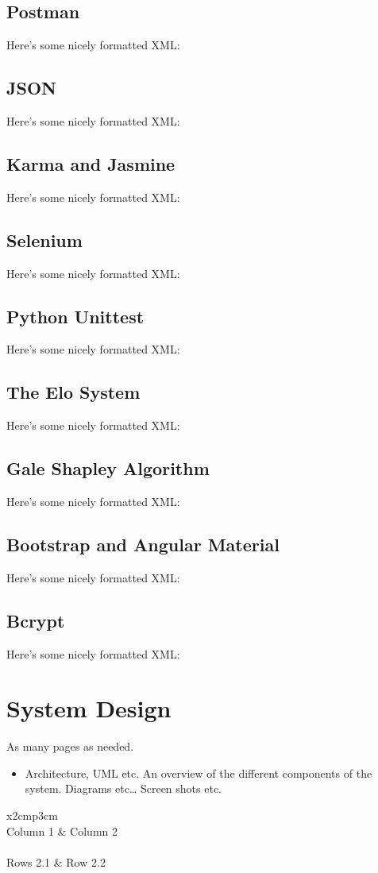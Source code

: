 \section{Postman}
Here's some nicely formatted XML:
\section{JSON}
Here's some nicely formatted XML:
\section{Karma and Jasmine}
Here's some nicely formatted XML:
\section{Selenium}
Here's some nicely formatted XML:
\section{Python Unittest}
Here's some nicely formatted XML:
\section{The Elo System}
Here's some nicely formatted XML:
\section{Gale Shapley Algorithm}
Here's some nicely formatted XML:
\section{Bootstrap and Angular Material}
Here's some nicely formatted XML:
\section{Bcrypt}
Here's some nicely formatted XML:
\chapter{System Design}
As many pages as needed.
\begin{itemize}
	\item Architecture, UML etc. An overview of the different components of the system. Diagrams etc… Screen shots etc.
\end{itemize}

\begin{table}[h]
	\centering
	\begin{tabular}{x{2cm}p{3cm}}
		\toprule \\
		Column 1 & Column 2 \\
		\midrule \\
		Rows 2.1 & Row 2.2 \\
		\bottomrule
	\end{tabular}
	\caption{A table.}
	\label{table:mytable}
\end{table}

